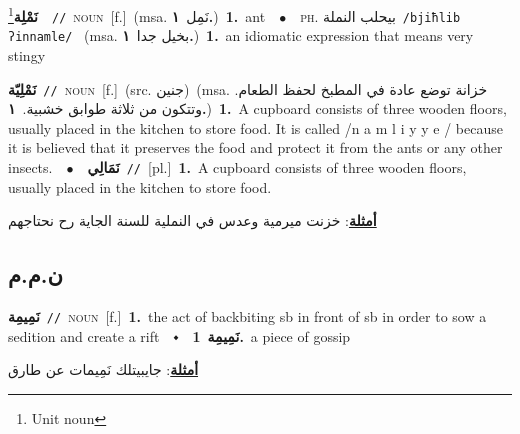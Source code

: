 \documentclass[10pt,a4paper,twoside]{article} %
\begin{document}
\begin{multicols}{2}
{\setlength\topsep{0pt}\textbf{\foreignlanguage{arabic}{نَمْلِة}}\footnote{Unit noun}\ \ {\color{gray}\texttt{//}\color{black}}\ \textsc{noun}\ [f.]\ \color{gray}(msa. \foreignlanguage{arabic}{نَمِل}~\foreignlanguage{arabic}{\textbf{١.}})\color{black}\ \textbf{1.}~ant\ \ $\bullet$\ \ \textsc{ph.} \color{gray} \foreignlanguage{arabic}{بيحلب النملة}\color{black}\ {\color{gray}\texttt{/{\sffamily bjiħlib ʔinnamle}/}\color{black}}\ \color{gray} (msa. \foreignlanguage{arabic}{بخيل جدا}~\foreignlanguage{arabic}{\textbf{١.}})\color{black}\ \textbf{1.}~an idiomatic expression that means very stingy\ } \vspace{2mm}

{\setlength\topsep{0pt}\textbf{\foreignlanguage{arabic}{نَمْلِيّة}}\ {\color{gray}\texttt{//}\color{black}}\ \textsc{noun}\ [f.]\ (src. \color{gray}\foreignlanguage{arabic}{جنين}\color{black})\ \color{gray}(msa. \foreignlanguage{arabic}{خزانة توضع عادة في المطبخ لحفظ الطعام. وتتكون من ثلاثة طوابق خشبية.}~\foreignlanguage{arabic}{\textbf{١.}})\color{black}\ \textbf{1.}~A cupboard consists of three wooden floors, usually placed in the kitchen to store food. It is called /n a m l i y y e / because it is believed that it preserves the food and protect it from the ants or any other insects.\ \ $\bullet$\ \ \setlength\topsep{0pt}\textbf{\foreignlanguage{arabic}{نَمَالِي}}\ {\color{gray}\texttt{//}\color{black}}\ [pl.]\ \textbf{1.}~A cupboard consists of three wooden floors, usually placed in the kitchen to store food.\  \begin{flushright}\color{gray}\foreignlanguage{arabic}{\textbf{\underline{\foreignlanguage{arabic}{أمثلة}}}: خزنت ميرمية وعدس في النملية للسنة الجاية رح نحتاجهم}\end{flushright}\color{black}} \vspace{2mm}

\vspace{-3mm}
\subsection*{\color{blue}\foreignlanguage{arabic}{ن.م.م}\color{blue}{}} 

{\setlength\topsep{0pt}\textbf{\foreignlanguage{arabic}{نَمِيمِة}}\ {\color{gray}\texttt{//}\color{black}}\ \textsc{noun}\ [f.]\ \textbf{1.}~the act of backbiting sb in front of sb in order to sow a sedition and create a rift\ \ $\smblkdiamond$\ \ \setlength\topsep{0pt}\textbf{\foreignlanguage{arabic}{نَمِيمِة}}\ \textbf{1.}~a piece of gossip\  \begin{flushright}\color{gray}\foreignlanguage{arabic}{\textbf{\underline{\foreignlanguage{arabic}{أمثلة}}}: جايبيتلك نَمِيمات عن طارق}\end{flushright}\color{black}} \vspace{2mm}


\end{multicols}
\end{document}
